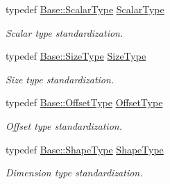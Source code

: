 \begin{DoxyCompactItemize}
typedef \hyperlink{classffnn_1_1layer_1_1internal_1_1_interface_a7f834e3365e5199bcbcd16d9abd63941}{Base\-::\-Scalar\-Type} \hyperlink{classffnn_1_1layer_1_1_layer_ab63020e6e3d9270a748cb22c2432c93a}{Scalar\-Type}
\begin{DoxyCompactList}\small\item\em Scalar type standardization. \end{DoxyCompactList}\item 
typedef \hyperlink{classffnn_1_1layer_1_1internal_1_1_interface_af0567642f60c65b5e87067226a54174b}{Base\-::\-Size\-Type} \hyperlink{classffnn_1_1layer_1_1_layer_aeccac281d4220fab9cebf78b004c09d1}{Size\-Type}
\begin{DoxyCompactList}\small\item\em Size type standardization. \end{DoxyCompactList}\item 
typedef \hyperlink{classffnn_1_1layer_1_1internal_1_1_interface_adc5bb454329ebd51ac26579a43c006fd}{Base\-::\-Offset\-Type} \hyperlink{classffnn_1_1layer_1_1_layer_a0e35ffd6e0657856f3a75323b2db9fcb}{Offset\-Type}
\begin{DoxyCompactList}\small\item\em Offset type standardization. \end{DoxyCompactList}\item 
typedef \hyperlink{classffnn_1_1layer_1_1internal_1_1_interface_a945709b1d0ea54a51539b80d04485f5f}{Base\-::\-Shape\-Type} \hyperlink{classffnn_1_1layer_1_1_layer_ab0b09d33e24cc8ea2b4e236ca4016ab9}{Shape\-Type}
\begin{DoxyCompactList}\small\item\em Dimension type standardization. \end{DoxyCompactList}\end{DoxyCompactItemize}
